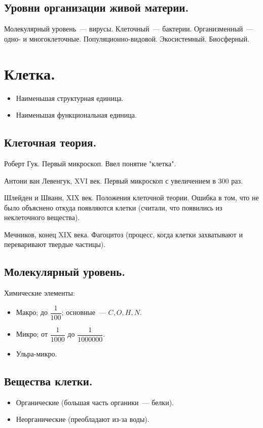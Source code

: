\documentclass[12pt]{article}
\begin{document}
	\subsection{Уровни организации живой материи.}
	Молекулярный уровень~--- вирусы. Клеточный~--- бактерии. Организменный~--- одно- и многоклеточные. Популяционно-видовой. Экосистемный. Биосферный.
	\section{Клетка.}
	\begin{itemize}
		\item Наименьшая структурная единица.
		\item Наименьшая функциональная единица.
	\end{itemize}
	\subsection{Клеточная теория.}
	\begin{person}
		Роберт Гук. Первый микроскоп. Ввел понятие "клетка".
	\end{person}
	\begin{person}
		Антони ван Левенгук, XVI век. Первый микроскоп с увеличением в $300$ раз.
	\end{person}
	\begin{person}
		Шлейден и Шванн, XIX век. Положения клеточной теории. Ошибка в том, что не было объяснено откуда появляются клетки (считали, что появились из неклеточного вещества).
	\end{person}
	\begin{person}
		Мечников, конец XIX века. Фагоцитоз (процесс, когда клетки захватывают и переваривают твердые частицы).
	\end{person}
	\subsection{Молекулярный уровень.}
	Химические элементы:
	\begin{itemize}
		\item Макро; до $\dfrac{1}{100}$; основные~--- $C, O, H, N$.
		\item Микро; от $\dfrac{1}{1000}$ до $\dfrac{1}{1000000}$.
		\item Ульра-микро.
	\end{itemize}
	\subsection{Вещества клетки.}
	\begin{itemize}
		\item Органические (большая часть органики~--- белки).
		\item Неорганические (преобладают из-за воды).
	\end{itemize}
\end{document}
